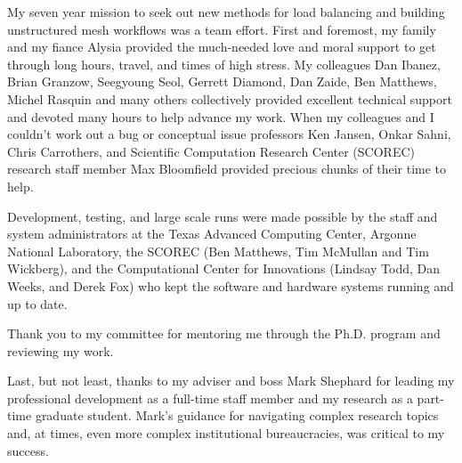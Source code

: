 My seven year mission to seek out new methods for load balancing and building
unstructured mesh workflows was a team effort.
First and foremost, my family and my fiance Alysia provided the much-needed love
and moral support to get through long hours, travel, and times of high stress.
My colleagues Dan Ibanez, Brian Granzow, Seegyoung Seol, Gerrett Diamond, Dan
Zaide, Ben Matthews, Michel Rasquin and many others collectively provided
excellent technical support and devoted many hours to help advance my work.
When my colleagues and I couldn't work out a bug or conceptual issue professors
Ken Jansen, Onkar Sahni, Chris Carrothers, and Scientific Computation Research
Center (SCOREC) research staff member Max Bloomfield provided precious chunks of
their time to help.

Development, testing, and large scale runs were made possible by the staff and
system administrators at the Texas Advanced Computing Center, Argonne National
Laboratory, the SCOREC (Ben Matthews, Tim McMullan and Tim Wickberg), and the
Computational Center for Innovations (Lindsay Todd, Dan Weeks, and Derek Fox)
who kept the software and hardware systems running and up to date.

Thank you to my committee for mentoring me through the Ph.D. program and
reviewing my work.

Last, but not least, thanks to my adviser and boss Mark Shephard for leading my
professional development as a full-time staff member and my research as a
part-time graduate student.
Mark's guidance for navigating complex research topics and, at times, even more
complex institutional bureaucracies, was critical to my success.
